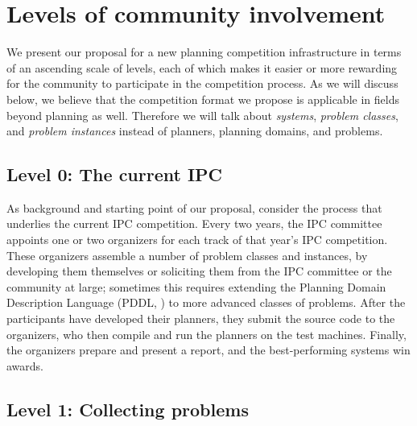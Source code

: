 \section{Levels of community involvement} \label{sec:levels}

We present our proposal for a new planning competition infrastructure
in terms of an ascending scale of levels, each of which makes it
easier or more rewarding for the community to participate in the
competition process.  As we will discuss below, we believe that the
competition format we propose is applicable in fields beyond planning
as well.  Therefore we will talk about \emph{systems}, \emph{problem
  classes}, and \emph{problem instances} instead of planners, planning
domains, and problems.


\subsection{Level 0: The current IPC}

As background and starting point of our proposal, consider the process
that underlies the current IPC competition.  Every two years, the IPC
committee appoints one or two organizers for each track of that year's
IPC competition.  These organizers assemble a number of problem
classes and instances, by developing them themselves or soliciting
them from the IPC committee or the community at large; sometimes this
requires extending the Planning Domain Description Language (PDDL,
\cite{PDDL}) to more advanced classes of problems.  After the
participants have developed their planners, they submit the source
code to the organizers, who then compile and run the planners on the
test machines.  Finally, the organizers prepare and present a report,
and the best-performing systems win awards.



\subsection{Level 1: Collecting problems}

